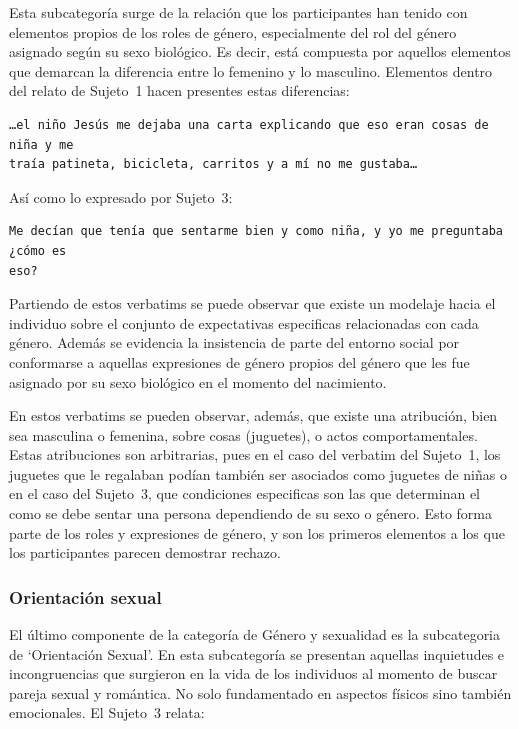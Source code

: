 Esta subcategoría surge de la relación que los participantes han tenido con
elementos propios de los roles de género, especialmente del rol del género
asignado según su sexo biológico. Es decir, está compuesta por aquellos
elementos que demarcan la diferencia entre lo femenino y lo masculino. Elementos
dentro del relato de Sujeto~1 hacen presentes estas diferencias:

\begin{verbatim}
…el niño Jesús me dejaba una carta explicando que eso eran cosas de niña y me
traía patineta, bicicleta, carritos y a mí no me gustaba…
\end{verbatim}

Así como lo expresado por Sujeto~3:

\begin{verbatim}
Me decían que tenía que sentarme bien y como niña, y yo me preguntaba ¿cómo es
eso?
\end{verbatim}

Partiendo de estos verbatims se puede observar que existe un modelaje hacia el
individuo sobre el conjunto de expectativas especificas relacionadas con cada
género. Además se evidencia la insistencia de parte del entorno social por
conformarse a aquellas expresiones de género propios del género que les fue
asignado por su sexo biológico en el momento del nacimiento.

En estos verbatims se pueden observar, además, que existe una atribución, bien
sea masculina o femenina, sobre cosas (juguetes), o actos comportamentales.
Estas atribuciones son arbitrarias, pues en el caso del verbatim del Sujeto~1,
los juguetes que le regalaban podían también ser asociados como juguetes de
niñas o en el caso del Sujeto~3, que condiciones especificas son las que
determinan el como se debe sentar una persona dependiendo de su sexo o género.
Esto forma parte de los roles y expresiones de género, y son los primeros
elementos a los que los participantes parecen demostrar rechazo.

\subsubsection{Orientación sexual}

El último componente de la categoría de Género y sexualidad es la subcategoria
de ‘Orientación Sexual’. En esta subcategoría se presentan aquellas inquietudes
e incongruencias que surgieron en la vida de los individuos al momento de buscar
pareja sexual y romántica. No solo fundamentado en aspectos físicos sino también
emocionales. El Sujeto~3 relata:

